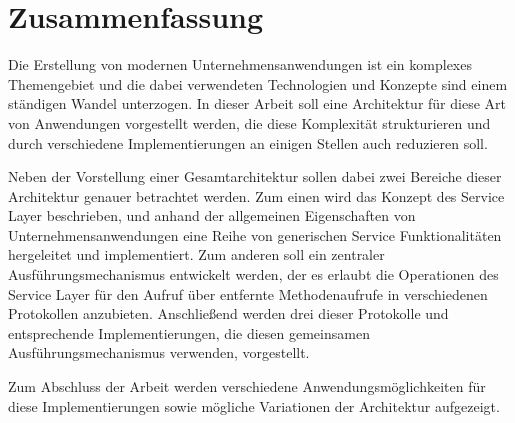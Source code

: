 \begingroup
\let\clearpage\relax
\let\cleardoublepage\relax
\let\cleardoublepage\relax



\vfill

\chapter*{Zusammenfassung}
Die Erstellung von modernen Unternehmensanwendungen ist ein komplexes
Themengebiet und die dabei verwendeten Technologien und Konzepte sind einem
ständigen Wandel unterzogen. In dieser Arbeit soll eine Architektur für diese Art
von Anwendungen vorgestellt werden, die diese Komplexität strukturieren und
durch verschiedene Implementierungen an einigen Stellen auch reduzieren soll.

Neben der Vorstellung einer Gesamtarchitektur sollen dabei zwei Bereiche dieser
Architektur genauer betrachtet werden. Zum einen wird das Konzept des Service
Layer beschrieben, und anhand der allgemeinen Eigenschaften von
Unternehmensanwendungen eine Reihe von generischen Service Funktionalitäten
hergeleitet und implementiert. Zum anderen soll ein zentraler
Ausführungsmechanismus entwickelt werden, der es erlaubt die Operationen des
Service Layer für den Aufruf über entfernte Methodenaufrufe in verschiedenen
Protokollen anzubieten. Anschließend werden drei dieser Protokolle und
entsprechende Implementierungen, die diesen gemeinsamen Ausführungsmechanismus
verwenden, vorgestellt.

Zum Abschluss der Arbeit werden verschiedene Anwendungsmöglichkeiten für diese
Implementierungen sowie mögliche Variationen der Architektur aufgezeigt.

\endgroup			

\vfill